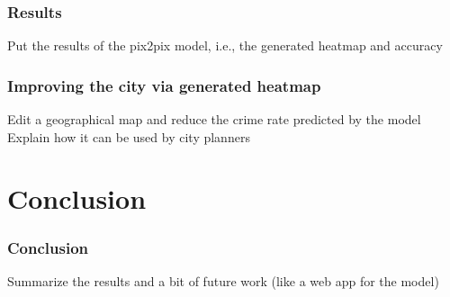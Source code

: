 \documentclass{beamer}
\begin{document}
\begin{frame}
    \frametitle{Results}
    Put the results of the pix2pix model, i.e., the generated heatmap and accuracy
\end{frame}

\begin{frame}
    \frametitle{Improving the city via generated heatmap}
    Edit a geographical map and reduce the crime rate predicted by the model
    Explain how it can be used by city planners
\end{frame}

\section{Conclusion}
\begin{frame}
    \frametitle{Conclusion}
    Summarize the results and a bit of future work (like a web app for the model)
\end{frame}
\end{document}
